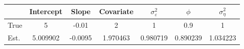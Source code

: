 \begin{tabular}{lcccccc}
\toprule
& Intercept & Slope & Covariate & $\sigma_\varepsilon^2$ & $\phi$ & $\sigma_\eta^2$ \\
\midrule
True & 5 & -0.01 & 2 & 1 & 0.9 & 1 \\
\midrule
Est. & 5.009902 & -0.0095 & 1.970463 & 0.980719 & 0.890239 & 1.034223 \\
\bottomrule
\end{tabular}
